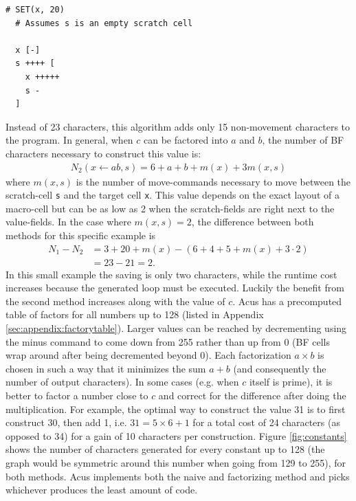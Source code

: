 \vspace{0.5cm}\noindent\begin{minipage}{\linewidth}
\begin{lstlisting}[style=brainfuck]
  # SET(x, 20)
  # Assumes s is an empty scratch cell
  
  x [-]         
  s ++++ [      
    x +++++     
    s -        
  ]
\end{lstlisting}
\end{minipage}
%
Instead of 23 characters, this algorithm adds only 15 non-movement characters to the program. In general, when $c$ can be factored into $a$ and $b$, the number of BF characters necessary to construct this value is:
\begin{align}
  N_2(x\leftarrow ab, s) = 6 + a + b + m(x) + 3m(x, s)
  \label{eq:n2}
\end{align}
where $m(x,s)$ is the number of move-commands necessary to move between the scratch-cell \texttt{s} and the target cell \texttt{x}. This value depends on the exact layout of a macro-cell but can be as low as 2 when the scratch-fields are right next to the value-fields. In the case where $m(x,s)=2$, the difference between both methods for this specific example is
\begin{align}
  N_1 - N_2 &= 3 + 20 + m(x) - (6 + 4 + 5 + m(x) + 3\cdot 2) \\
            &= 23 - 21 = 2.
\end{align}
In this small example the saving is only two characters, while the runtime cost increases because the generated loop must be executed. Luckily the benefit from the second method increases along with the value of $c$. Acus has a precomputed table of factors for all numbers up to 128 (listed in Appendix \ref{sec:appendix:factorytable}). Larger values can be reached by decrementing using the minus command to come down from 255 rather than up from 0 (BF cells wrap around after being decremented beyond 0). Each factorization $a\times b$ is chosen in such a way that it minimizes the sum $a+b$ (and consequently the number of output characters). In some cases (e.g. when $c$ itself is prime), it is better to factor a number close to $c$ and correct for the difference after doing the multiplication. For example, the optimal way to construct the value 31 is to first construct 30, then add 1, i.e. $31 = 5\times6 + 1$ for a total cost of 24 characters (as opposed to 34) for a gain of 10 characters per construction. Figure \ref{fig:constants} shows the number of characters generated for every constant up to 128 (the graph would be symmetric around this number when going from 129 to 255), for both methods. Acus implements both the naive and factorizing method and picks whichever produces the least amount of code.

